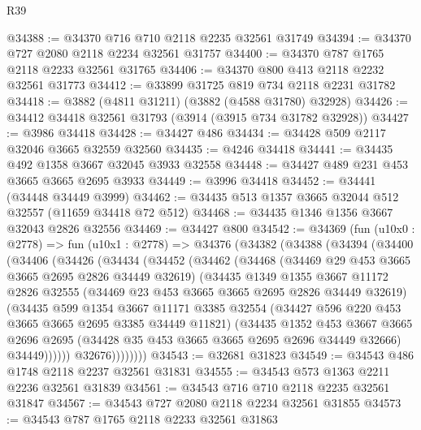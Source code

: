 \begin{lexlean}{R39}
\begin{coremodule}
@34388 := @34370 @716 @710 @2118 @2235 @32561 @31749
@34394 := @34370 @727 @2080 @2118 @2234 @32561 @31757
@34400 := @34370 @787 @1765 @2118 @2233 @32561 @31765
@34406 := @34370 @800 @413 @2118 @2232 @32561 @31773
@34412 := @33899 @31725 @819 @734 @2118 @2231 @31782
@34418 := @3882 (@4811 @31211) (@3882 (@4588 @31780) @32928)
@34426 := @34412 @34418 @32561 @31793 (@3914 (@3915 @734 @31782 @32928))
@34427 := @3986 @34418
@34428 := @34427 @486
@34434 := @34428 @509 @2117 @32046 @3665 @32559 @32560
@34435 := @4246 @34418
@34441 := @34435 @492 @1358 @3667 @32045 @3933 @32558
@34448 := @34427 @489 @231 @453 @3665 @3665 @2695 @3933
@34449 := @3996 @34418
@34452 := @34441 (@34448 @34449 @3999)
@34462 := @34435 @513 @1357 @3665 @32044 @512 @32557 (@11659 @34418 @72 @512)
@34468 := @34435 @1346 @1356 @3667 @32043 @2826 @32556
@34469 := @34427 @800
@34542 := @34369
    (fun (u10x0 : @2778) =>
    fun (u10x1 : @2778) =>
    @34376
      (@34382
        (@34388
          (@34394
            (@34400
              (@34406
                (@34426
                  (@34434
                    (@34452
                      (@34462
                        (@34468
                          (@34469 @29 @453 @3665 @3665 @2695 @2826 @34449 @32619)
                          (@34435
                            @1349
                            @1355
                            @3667
                            @11172
                            @2826
                            @32555
                            (@34469 @23 @453 @3665 @3665 @2695 @2826 @34449 @32619)
                            (@34435
                              @599
                              @1354
                              @3667
                              @11171
                              @3385
                              @32554
                              (@34427 @596 @220 @453 @3665 @3665 @2695 @3385 @34449 @11821)
                              (@34435
                                @1352
                                @453
                                @3667
                                @3665
                                @2696
                                @2695
                                (@34428 @35 @453 @3665 @3665 @2695 @2696 @34449 @32666)
                                @34449))))))
                    @32676))))))))
@34543 := @32681 @31823
@34549 := @34543 @486 @1748 @2118 @2237 @32561 @31831
@34555 := @34543 @573 @1363 @2211 @2236 @32561 @31839
@34561 := @34543 @716 @710 @2118 @2235 @32561 @31847
@34567 := @34543 @727 @2080 @2118 @2234 @32561 @31855
@34573 := @34543 @787 @1765 @2118 @2233 @32561 @31863

\end{coremodule}
\end{lexlean}
